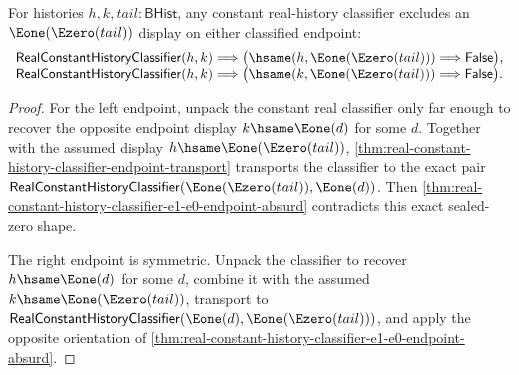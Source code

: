 \begin{theorem}
\label{thm:real-constant-history-classifier-transported-inner-e0-endpoint-absurd}
For histories $h,k,tail:\mathsf{BHist}$, any constant real-history classifier
excludes an $\Eone(\Ezero(tail))$ display on either classified endpoint:
$$
\begin{array}{l}
\mathsf{RealConstantHistoryClassifier}(h,k)
\Longrightarrow
\bigl(\hsame(h,\Eone(\Ezero(tail)))\Longrightarrow\mathsf{False}\bigr),\\
\mathsf{RealConstantHistoryClassifier}(h,k)
\Longrightarrow
\bigl(\hsame(k,\Eone(\Ezero(tail)))\Longrightarrow\mathsf{False}\bigr).
\end{array}
$$
\end{theorem}
\begin{proof}
For the left endpoint, unpack the constant real classifier only far enough to
recover the opposite endpoint display $k\hsame\Eone(d)$ for some $d$. Together
with the assumed display $h\hsame\Eone(\Ezero(tail))$,
\autoref{thm:real-constant-history-classifier-endpoint-transport} transports
the classifier to the exact pair
$\mathsf{RealConstantHistoryClassifier}(\Eone(\Ezero(tail)),\Eone(d))$.
Then \autoref{thm:real-constant-history-classifier-e1-e0-endpoint-absurd}
contradicts this exact sealed-zero shape.

The right endpoint is symmetric. Unpack the classifier to recover
$h\hsame\Eone(d)$ for some $d$, combine it with the assumed
$k\hsame\Eone(\Ezero(tail))$, transport to
$\mathsf{RealConstantHistoryClassifier}(\Eone(d),\Eone(\Ezero(tail)))$, and
apply the opposite orientation of
\autoref{thm:real-constant-history-classifier-e1-e0-endpoint-absurd}.
\end{proof}

